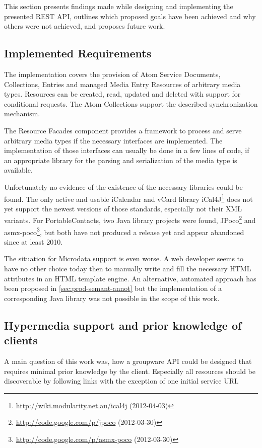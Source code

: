 \documentclass[11pt,a4paper,headsepline,twoside]{scrartcl}		%
\newcommand{\citeurl}[2]{\url{#1} (#2)}
\begin{document}
This section presents findings made while designing and implementing the
presented REST API, outlines which proposed goals have been achieved and why
others were not achieved, and proposes future work.

\subsection{Implemented Requirements}
\label{sec:impl-requ}

The implementation covers the provision of Atom Service Documents, Collections,
Entries and managed Media Entry Resources of arbitrary media types. Resources can
be created, read, updated and deleted with support for conditional requests. The
Atom Collections support the described synchronization mechanism.

The Resource Facades component provides a framework to process and serve
arbitrary media types if the necessary interfaces are implemented. The
implementation of those interfaces can usually be done in a few lines of code,
if an appropriate library for the parsing and serialization of the media type is
available.

Unfortunately no evidence of the existence of the necessary libraries could be
found. The only active and usable iCalendar and vCard library
iCal4J\footnote{\citeurl{http://wiki.modularity.net.au/ical4j}{2012-04-03}} does
not yet support the newest versions of those standards, especially not their XML
variants. For PortableContacts, two Java library projects were found,
JPoco\footnote{\citeurl{http://code.google.com/p/jpoco}{2012-03-30}} and
asmx-poco\footnote{\citeurl{http://code.google.com/p/asmx-poco}{2012-03-30}},
but both have not produced a release yet and appear abandoned since at least
2010.

The situation for Microdata support is even worse. A web developer seems to have
no other choice today then to manually write and fill the necessary HTML
attributes in an HTML template engine. An alternative, automated approach has
been proposed in \autoref{sec:prod-semant-annot} but the implementation of a
corresponding Java library was not possible in the scope of this work.

\subsection{Hypermedia support and prior knowledge of clients}
\label{sec:hyperm-supp-disc}

A main question of this work was, how a groupware API could be designed that
requires minimal prior knowledge by the client. Especially all resources should
be discoverable by following links with the exception of one initial service
URI.
\end{document}
